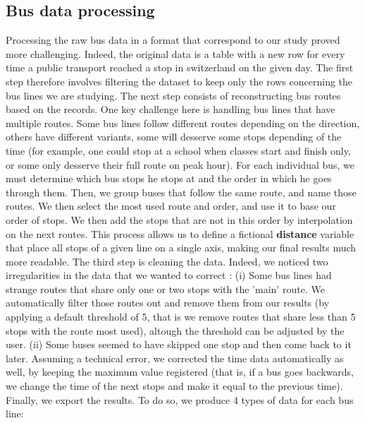 \subsection{Bus data processing}
Processing the raw bus data in a format that correspond to our study proved more challenging. Indeed, the original data is a table with a new row for every time a public transport reached a stop in switzerland on the given day. The first step therefore involves filtering the dataset to keep only the rows concerning the bus lines we are studying. 
The next step consists of reconstructing bus routes based on the records. One key challenge here is handling bus lines that have multiple routes. Some bus lines follow different routes depending on the direction, others have different variants, some will desserve some stops depending of the time (for example, one could stop at a school when classes start and finish only, or some only desserve their full route on peak hour). For each individual bus, we must determine which bus stops he stops at and the order in which he goes through them. Then, we group buses that follow the same route, and name those routes. We then select the most used route and order, and use it to base our order of stops. We then add the stops that are not in this order by interpolation on the next routes. This process allows us to define a fictional \textbf{distance} variable that place all stops of a given line on a single axis, making our final results much more readable.
The third step is cleaning the data. Indeed, we noticed two irregularities in the data that we wanted to correct : (i) Some bus lines had strange routes that share only one or two stops with the 'main' route. We automatically filter those routes out and remove them from our results (by applying a default threshold of 5, that is we remove routes that share less than 5 stops with the route most used), altough the threshold can be adjusted by the user. (ii) Some buses seemed to have skipped one stop and then come back to it later. Assuming a technical error, we corrected the time data automatically as well, by keeping the maximum value registered (that is, if a bus goes backwards, we change the time of the next stops and make it equal to the previous time).
Finally, we export the results. To do so, we produce 4 types of data for each bus line:
